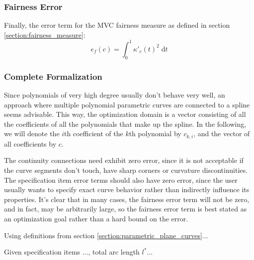 \documentclass[a4paper]{article}
\newcommand{\apply}[2]{#1\!\left(#2\right)}
\begin{document}
			\subsubsection{Fairness Error}
			\label{section:fairness_error}

				Finally, the error term for the MVC fairness measure as defined in section \ref{section:fairness_measure}:
				\begin{equation*}
					\apply{e_f}{c} = \int_{0}^{1}\apply{\kappa'_c}{t}^2\;\mathrm{d}t
				\end{equation*}

			\subsubsection{Complete Formalization}
			\label{section:complete_formalization}

				Since polynomials of very high degree usually don't behave very well, an approach where multiple polynomial parametric curves are connected to a spline seems advisable. This way, the optimization domain is a vector consisting of all the coefficients of all the polynomials that make up the spline. In the following, we will denote the \(i\)th coefficient of the \(k\)th polynomial by \(c_{k,i}\), and the vector of all coefficients by \(c\).


				The continuity connections need exhibit zero error, since it is not acceptable if the curve segments don't touch, have sharp corners or curvature discontinuities. The specification item error terms should also have zero error, since the user usually wants to specify exact curve behavior rather than indirectly influence its properties. It's clear that in many cases, the fairness error term will not be zero, and in fact, may be arbitrarily large, so the fairness error term is best stated as an optimization goal rather than a hard bound on the error. 

				Using definitions from section \ref{section:parametric_plane_curves}...

				Given specification items ..., total arc length \(l^*\)...

\end{document}
